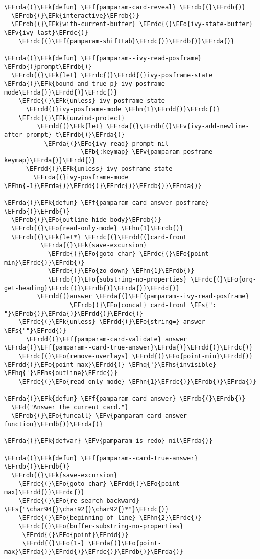 \documentclass[a4wide,10pt]{article}
\newcommand{\EFs}[1]{\textcolor{EFs}{#1}} %
\newcommand{\EFd}[1]{\textcolor{EFd}{#1}} %
\newcommand{\EFk}[1]{\textcolor{EFk}{#1}} %
\newcommand{\EFb}[1]{\textcolor{EFb}{#1}} %
\newcommand{\EFf}[1]{\textcolor{EFf}{#1}} %
\newcommand{\EFv}[1]{\textcolor{EFv}{#1}} %
\newcommand{\EFo}[1]{\textcolor{EFo}{#1}} %
\newcommand{\EFhn}[1]{\textcolor{EFhn}{\textbf{#1}}} %
\newcommand{\EFhq}[1]{\textcolor{EFhq}{#1}} %
\newcommand{\EFhs}[1]{\textcolor{EFhs}{#1}} %
\newcommand{\EFrda}[1]{\textcolor{EFrda}{#1}} %
\newcommand{\EFrdb}[1]{\textcolor{EFrdb}{#1}} %
\newcommand{\EFrdc}[1]{\textcolor{EFrdc}{#1}} %
\newcommand{\EFrdd}[1]{\textcolor{EFrdd}{#1}} %
\begin{document}
\begin{Code}
\begin{Verbatim}
\EFrda{(}\EFk{defun} \EFf{pamparam-card-reveal} \EFrdb{(}\EFrdb{)}
  \EFrdb{(}\EFk{interactive}\EFrdb{)}
  \EFrdb{(}\EFk{with-current-buffer} \EFrdc{(}\EFo{ivy-state-buffer} \EFv{ivy-last}\EFrdc{)}
    \EFrdc{(}\EFf{pamparam-shifttab}\EFrdc{)}\EFrdb{)}\EFrda{)}

\EFrda{(}\EFk{defun} \EFf{pamparam--ivy-read-posframe} \EFrdb{(}prompt\EFrdb{)}
  \EFrdb{(}\EFk{let} \EFrdc{(}\EFrdd{(}ivy-posframe-state \EFrda{(}\EFk{bound-and-true-p} ivy-posframe-mode\EFrda{)}\EFrdd{)}\EFrdc{)}
    \EFrdc{(}\EFk{unless} ivy-posframe-state
      \EFrdd{(}ivy-posframe-mode \EFhn{1}\EFrdd{)}\EFrdc{)}
    \EFrdc{(}\EFk{unwind-protect}
         \EFrdd{(}\EFk{let} \EFrda{(}\EFrdb{(}\EFv{ivy-add-newline-after-prompt} t\EFrdb{)}\EFrda{)}
           \EFrda{(}\EFo{ivy-read} prompt nil
                     \EFb{:keymap} \EFv{pamparam-posframe-keymap}\EFrda{)}\EFrdd{)}
      \EFrdd{(}\EFk{unless} ivy-posframe-state
        \EFrda{(}ivy-posframe-mode \EFhn{-1}\EFrda{)}\EFrdd{)}\EFrdc{)}\EFrdb{)}\EFrda{)}

\EFrda{(}\EFk{defun} \EFf{pamparam-card-answer-posframe} \EFrdb{(}\EFrdb{)}
  \EFrdb{(}\EFo{outline-hide-body}\EFrdb{)}
  \EFrdb{(}\EFo{read-only-mode} \EFhn{1}\EFrdb{)}
  \EFrdb{(}\EFk{let*} \EFrdc{(}\EFrdd{(}card-front
          \EFrda{(}\EFk{save-excursion}
            \EFrdb{(}\EFo{goto-char} \EFrdc{(}\EFo{point-min}\EFrdc{)}\EFrdb{)}
            \EFrdb{(}\EFo{zo-down} \EFhn{1}\EFrdb{)}
            \EFrdb{(}\EFo{substring-no-properties} \EFrdc{(}\EFo{org-get-heading}\EFrdc{)}\EFrdb{)}\EFrda{)}\EFrdd{)}
         \EFrdd{(}answer \EFrda{(}\EFf{pamparam--ivy-read-posframe}
                  \EFrdb{(}\EFo{concat} card-front \EFs{": "}\EFrdb{)}\EFrda{)}\EFrdd{)}\EFrdc{)}
    \EFrdc{(}\EFk{unless} \EFrdd{(}\EFo{string=} answer \EFs{""}\EFrdd{)}
      \EFrdd{(}\EFf{pamparam-card-validate} answer \EFrda{(}\EFf{pamparam--card-true-answer}\EFrda{)}\EFrdd{)}\EFrdc{)}
    \EFrdc{(}\EFo{remove-overlays} \EFrdd{(}\EFo{point-min}\EFrdd{)} \EFrdd{(}\EFo{point-max}\EFrdd{)} \EFhq{'}\EFhs{invisible} \EFhq{'}\EFhs{outline}\EFrdc{)}
    \EFrdc{(}\EFo{read-only-mode} \EFhn{1}\EFrdc{)}\EFrdb{)}\EFrda{)}

\EFrda{(}\EFk{defun} \EFf{pamparam-card-answer} \EFrdb{(}\EFrdb{)}
  \EFd{"Answer the current card."}
  \EFrdb{(}\EFo{funcall} \EFv{pamparam-card-answer-function}\EFrdb{)}\EFrda{)}

\EFrda{(}\EFk{defvar} \EFv{pamparam-is-redo} nil\EFrda{)}

\EFrda{(}\EFk{defun} \EFf{pamparam--card-true-answer} \EFrdb{(}\EFrdb{)}
  \EFrdb{(}\EFk{save-excursion}
    \EFrdc{(}\EFo{goto-char} \EFrdd{(}\EFo{point-max}\EFrdd{)}\EFrdc{)}
    \EFrdc{(}\EFo{re-search-backward} \EFs{"\char94{}\char92{}\char92{}*"}\EFrdc{)}
    \EFrdc{(}\EFo{beginning-of-line} \EFhn{2}\EFrdc{)}
    \EFrdc{(}\EFo{buffer-substring-no-properties}
     \EFrdd{(}\EFo{point}\EFrdd{)}
     \EFrdd{(}\EFo{1-} \EFrda{(}\EFo{point-max}\EFrda{)}\EFrdd{)}\EFrdc{)}\EFrdb{)}\EFrda{)}


\end{Verbatim}
\end{Code}
\end{document}
